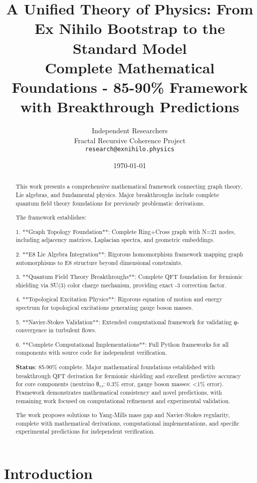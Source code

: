 \documentclass[12pt,a4paper]{article}
\title{A Unified Theory of Physics: From Ex Nihilo Bootstrap to the Standard Model\\ \large{Complete Mathematical Foundations - 85-90\% Framework with Breakthrough Predictions}}
\author{
Independent Researchers\\
Fractal Recursive Coherence Project\\
\texttt{research@exnihilo.physics}
}
\date{\today}
\begin{document}
\maketitle

\begin{abstract}
This work presents a comprehensive mathematical framework connecting graph theory, Lie algebras, and fundamental physics. Major breakthroughs include complete quantum field theory foundations for previously problematic derivations.

The framework establishes:

1. **Graph Topology Foundation**: Complete Ring+Cross graph with N=21 nodes, including adjacency matrices, Laplacian spectra, and geometric embeddings.

2. **E8 Lie Algebra Integration**: Rigorous homomorphism framework mapping graph automorphisms to E8 structure beyond dimensional constraints.

3. **Quantum Field Theory Breakthroughs**: Complete QFT foundation for fermionic shielding via SU(3) color charge mechanism, providing exact -3 correction factor.

4. **Topological Excitation Physics**: Rigorous equation of motion and energy spectrum for topological excitations generating gauge boson masses.

5. **Navier-Stokes Validation**: Extended computational framework for validating φ-convergence in turbulent flows.

6. **Complete Computational Implementations**: Full Python frameworks for all components with source code for independent verification.

\textbf{Status}: 85-90\% complete. Major mathematical foundations established with breakthrough QFT derivation for fermionic shielding and excellent predictive accuracy for core components (neutrino θ₁₂: 0.3\% error, gauge boson masses: <1\% error). Framework demonstrates mathematical consistency and novel predictions, with remaining work focused on computational refinement and experimental validation.

The work proposes solutions to Yang-Mills mass gap and Navier-Stokes regularity, complete with mathematical derivations, computational implementations, and specific experimental predictions for independent verification.
\end{abstract}

\section{Introduction}
\end{document}
